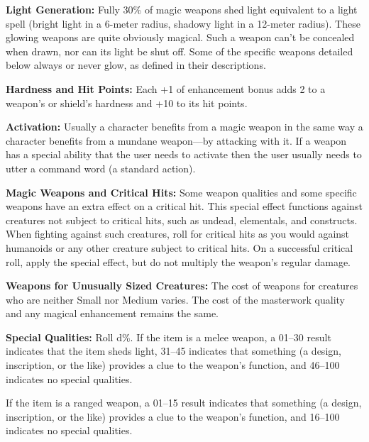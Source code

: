 \textbf{Light Generation:} Fully 30\% of magic weapons shed light equivalent to a light spell (bright light in a 6-meter radius, shadowy light in a 12-meter radius). These glowing weapons are quite obviously magical. Such a weapon can't be concealed when drawn, nor can its light be shut off. Some of the specific weapons detailed below always or never glow, as defined in their descriptions.

\textbf{Hardness and Hit Points:} Each +1 of enhancement bonus adds 2 to a weapon's or shield's hardness and +10 to its hit points.

\textbf{Activation:} Usually a character benefits from a magic weapon in the same way a character benefits from a mundane weapon---by attacking with it. If a weapon has a special ability that the user needs to activate then the user usually needs to utter a command word (a standard action).

\textbf{Magic Weapons and Critical Hits:} Some weapon qualities and some specific weapons have an extra effect on a critical hit. This special effect functions against creatures not subject to critical hits, such as undead, elementals, and constructs. When fighting against such creatures, roll for critical hits as you would against humanoids or any other creature subject to critical hits. On a successful critical roll, apply the special effect, but do not multiply the weapon's regular damage.

\textbf{Weapons for Unusually Sized Creatures:} The cost of weapons for creatures who are neither Small nor Medium varies. The cost of the masterwork quality and any magical enhancement remains the same.

\textbf{Special Qualities:} Roll d\%. If the item is a melee weapon, a 01--30 result indicates that the item sheds light, 31--45 indicates that something (a design, inscription, or the like) provides a clue to the weapon's function, and 46--100 indicates no special qualities.

If the item is a ranged weapon, a 01--15 result indicates that something (a design, inscription, or the like) provides a clue to the weapon's function, and 16--100 indicates no special qualities.

